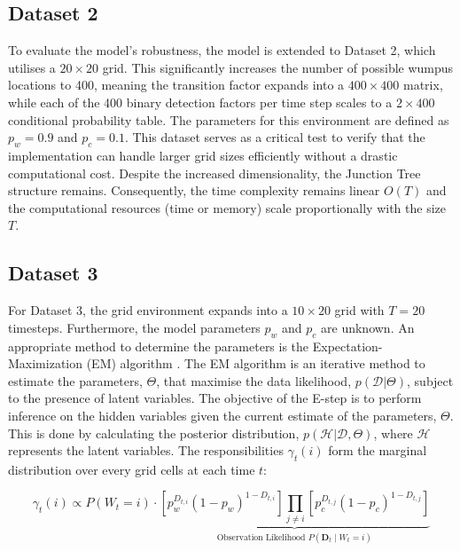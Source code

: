 \documentclass[10pt]{article}
\begin{document}
\subsection{Dataset 2}
To evaluate the model's robustness, the model is extended to Dataset 2, which utilises a $20 \times 20$ grid. This significantly increases the number of possible wumpus locations 
to 400, meaning the transition factor expands into a $400 \times 400$ matrix, while each of the 400 binary detection factors per time step scales to a $2 \times 400$ conditional probability table. 
The parameters for this environment are defined as $p_w = 0.9$ and $p_c = 0.1$. This dataset serves as a critical test to verify that the implementation can handle 
larger grid sizes efficiently without a drastic computational cost. Despite the increased dimensionality, the Junction Tree structure remains. Consequently, the time 
complexity remains linear $O(T)$ and the computational resources (time or memory) scale proportionally with the size $T$.

\subsection{Dataset 3}
\label{sec:EMderiv}
For Dataset 3, the grid environment expands into a $10 \times 20$ grid with $T = 20$ timesteps. Furthermore, the model parameters 
$p_w$ and $p_c$ are unknown. An appropriate method to determine the parameters is the Expectation-Maximization (EM) algorithm \cite{dupreez2026PARAM}. 
The EM algorithm is an iterative method to estimate the parameters, $\Theta$, that maximise the data likelihood, $p(\mathbf{\mathcal{D} } | \Theta)$, subject to the presence of latent variables.
The objective of the E-step is to perform inference on the hidden variables given the current estimate of the parameters, $\Theta$. 
This is done by calculating the posterior distribution, $p(\mathcal{H}  | \mathbf{\mathcal{D}}, \Theta)$, where $\mathcal{H} $ represents the latent variables. 
The responsibilities $\gamma_t(i)$ form the marginal distribution over every grid cells at each time $t$:

\begin{equation}
\gamma_t(i) \propto P(W_t = i) \cdot \underbrace{\left[ p_w^{D_{t,i}} (1-p_w)^{1-D_{t,i}} \right] \prod_{j \neq i} \left[ p_c^{D_{t,j}} (1-p_c)^{1-D_{t,j}} \right]}_{\text{Observation Likelihood } P(\mathbf{D}_t \mid W_t = i)}
\label{eq:gamma_short}
\end{equation}
\end{document}
